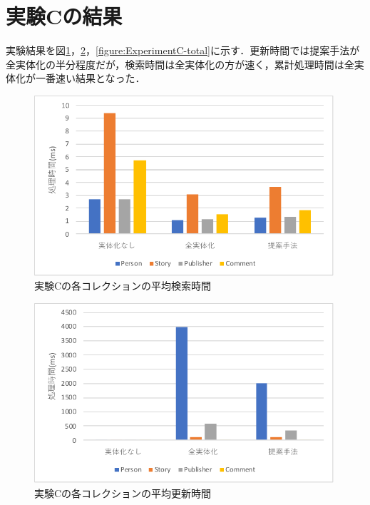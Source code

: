 \documentclass[a4paper,11pt]{ujreport}
\begin{document}
\section{実験Cの結果}
実験結果を図\ref{figure:ExperimentC-find}，\ref{figure:ExperimentC-update}，\ref{figure:ExperimentC-total}に示す．更新時間では提案手法が全実体化の半分程度だが，検索時間は全実体化の方が速く，累計処理時間は全実体化が一番速い結果となった．
\begin{figure}[htbp]
	\begin{center}
		\includegraphics[width=30em]{src/ExperimentC-find.pdf} %
	\end{center}
	\caption{実験Cの各コレクションの平均検索時間}
	\label{figure:ExperimentC-find}
\end{figure}
\begin{figure}[htbp]
	\begin{center}
		\includegraphics[width=30em]{src/ExperimentC-update.pdf} %
	\end{center}
	\caption{実験Cの各コレクションの平均更新時間}
	\label{figure:ExperimentC-update}
\end{figure}
\end{document}
